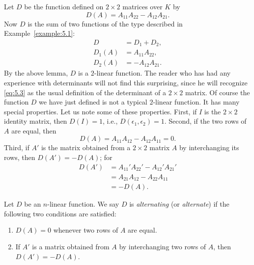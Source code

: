 \begin{example}\label{example:5.3}
    Let \(D\) be the function defined on \(2\times 2\) matrices over \(K\) by
    \begin{equation}
        D\left(A\right)=A_{11}A_{22}-A_{12}A_{21}.\label{eq:5.3}
    \end{equation}
    Now \(D\) is the sum of two functions of the type described in Example~\ref{example:5.1}:
    \begin{align*}
        D&=D_1+D_2,\\
        D_1\left(A\right)&=A_{11}A_{22},\\
        D_2\left(A\right)&=-A_{12}A_{21}.
    \end{align*}
    By the above lemma, \(D\) is a \(2\)-linear function. The reader who has had any experience with determinants will not find this surprising, since he will recognize \eqref{eq:5.3} as the usual definition of the determinant of a \(2\times2\) matrix. Of course the function \(D\) we have just defined is not a typical \(2\)-linear function. It has many special properties. Let us note some of these properties. First, if \(I\) is the \(2\times2\) identity matrix, then \(D\left(I\right)=1\), i.e., \(D\left(\epsilon_1,\epsilon_2\right)=1\). Second, if the two rows of \(A\) are equal, then
    \begin{equation*}
        D\left(A\right)=A_{11}A_{12}-A_{12}A_{11}=0.
    \end{equation*}
    Third, if \(A'\) is the matrix obtained from a \(2\times2\) matrix \(A\) by interchanging its rows, then \(D\left(A'\right)=-D\left(A\right)\); for
    \begin{align*}
        D\left(A'\right)&=A_{11}'A_{22}'-A_{12}'A_{21}'\\
        &=A_{21}A_{12}-A_{22}A_{11}\\
        &=-D\left(A\right).
    \end{align*}
\end{example}

\begin{definition}
    Let \(D\) be an \(n\)-linear function. We say \(D\) is \emph{alternating} (or \emph{alternate}) if the following two conditions are satisfied:
    \begin{enumerate}
        \item\label{itm:5.2.1} \(D\left(A\right)=0\) whenever two rows of \(A\) are equal.
        \item\label{itm:5.2.2} If \(A'\) is a matrix obtained from \(A\) by interchanging two rows of \(A\), then \(D\left(A'\right)=-D\left(A\right)\).
    \end{enumerate}
\end{definition}

